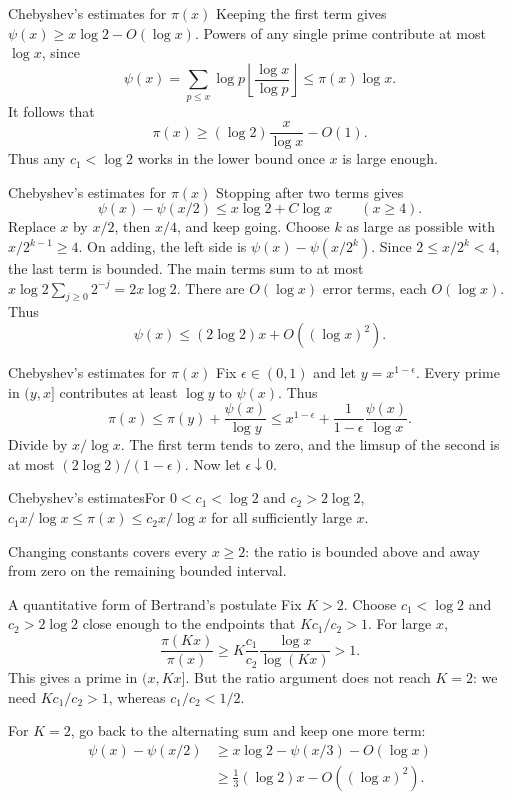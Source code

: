 \documentclass[aspectratio=169,11pt]{beamer}
\begin{document}
\begin{frame}{Chebyshev's estimates for $\pi(x)$}
Keeping the first term gives $\psi(x)\ge x\log2-O(\log x)$. Powers of any single prime contribute at most $\log x$, since
\[\psi(x)=\sum_{p\le x}\log p\left\lfloor\frac{\log x}{\log p}\right\rfloor\le\pi(x)\log x.\]
It follows that
\[\pi(x)\ge(\log2)\frac{x}{\log x}-O(1).\]
Thus any $c_1<\log2$ works in the lower bound once $x$ is large enough.
\end{frame}
\begin{frame}{Chebyshev's estimates for $\pi(x)$}
Stopping after two terms gives
\[\psi(x)-\psi(x/2)\le x\log2+C\log x\qquad(x\ge4).\]
Replace $x$ by $x/2$, then $x/4$, and keep going. Choose $k$ as large as possible with $x/2^{k-1}\ge4$. On adding, the left side is $\psi(x)-\psi(x/2^k)$. Since $2\le x/2^k<4$, the last term is bounded. The main terms sum to at most $x\log2\sum_{j\ge0}2^{-j}=2x\log2$. There are $O(\log x)$ error terms, each $O(\log x)$. Thus
\[\psi(x)\le(2\log2)x+O((\log x)^2).\]
\end{frame}
\begin{frame}{Chebyshev's estimates for $\pi(x)$}
Fix $\epsilon\in(0,1)$ and let $y=x^{1-\epsilon}$. Every prime in $(y,x]$ contributes at least $\log y$ to $\psi(x)$. Thus
\[\pi(x)\le\pi(y)+\frac{\psi(x)}{\log y}\le x^{1-\epsilon}+\frac1{1-\epsilon}\frac{\psi(x)}{\log x}.\]
Divide by $x/\log x$. The first term tends to zero, and the limsup of the second is at most $(2\log2)/(1-\epsilon)$. Now let $\epsilon\downarrow0$.
\begin{block}{Chebyshev's estimates}For $0<c_1<\log2$ and $c_2>2\log2$, $c_1x/\log x\le\pi(x)\le c_2x/\log x$ for all sufficiently large $x$.\end{block}
Changing constants covers every $x\ge2$: the ratio is bounded above and away from zero on the remaining bounded interval.
\end{frame}
\begin{frame}{A quantitative form of Bertrand's postulate}
Fix $K>2$. Choose $c_1<\log2$ and $c_2>2\log2$ close enough to the endpoints that $Kc_1/c_2>1$. For large $x$,
\[\frac{\pi(Kx)}{\pi(x)}\ge K\frac{c_1}{c_2}\frac{\log x}{\log(Kx)}>1.\]
This gives a prime in $(x,Kx]$. But the ratio argument does not reach $K=2$: we need $Kc_1/c_2>1$, whereas $c_1/c_2<1/2$.

For $K=2$, go back to the alternating sum and keep one more term:
\begin{align*}
\psi(x)-\psi(x/2)&\ge x\log2-\psi(x/3)-O(\log x)\\
&\ge\tfrac13(\log2)x-O((\log x)^2).
\end{align*}
\end{frame}
\end{document}
